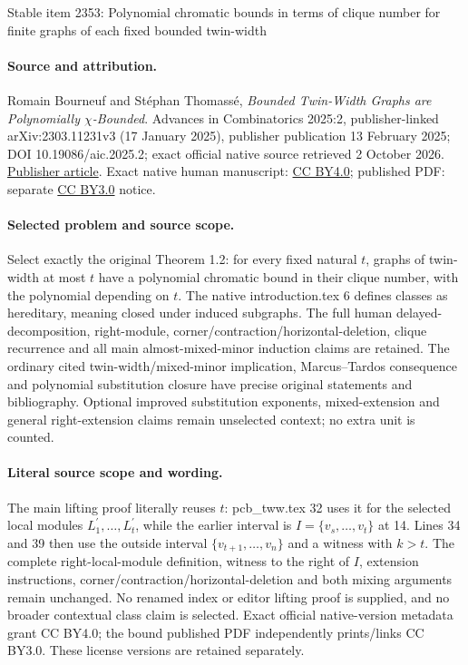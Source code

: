 \documentclass[11pt]{article}
\numberwithin{equation}{section}
\begin{document}
\begin{center}{\Large Stable item 2353: Polynomial chromatic bounds in terms of clique number for finite graphs of each fixed bounded twin-width}\end{center}
\paragraph{Source and attribution.} Romain Bourneuf and Stéphan Thomassé, \emph{Bounded Twin-Width Graphs are Polynomially \(\chi\)-Bounded}. Advances in Combinatorics 2025:2, publisher-linked arXiv:2303.11231v3 (17 January 2025), publisher publication 13 February 2025; DOI 10.19086/aic.2025.2; exact official native source retrieved 2 October 2026. \href{https://www.advancesincombinatorics.com/article/128477-bounded-twin-width-graphs-are-polynomially-bounded}{Publisher article}. Exact native human manuscript: \href{https://creativecommons.org/licenses/by/4.0/}{CC BY4.0}; published PDF: separate \href{https://creativecommons.org/licenses/by/3.0/}{CC BY3.0} notice.
\paragraph{Selected problem and source scope.} Select exactly the original Theorem 1.2: for every fixed natural \(t\), graphs of twin-width at most \(t\) have a polynomial chromatic bound in their clique number, with the polynomial depending on \(t\). The native introduction.tex 6 defines classes as hereditary, meaning closed under induced subgraphs. The full human delayed-decomposition, right-module, corner/contraction/horizontal-deletion, clique recurrence and all main almost-mixed-minor induction claims are retained. The ordinary cited twin-width/mixed-minor implication, Marcus--Tardos consequence and polynomial substitution closure have precise original statements and bibliography. Optional improved substitution exponents, mixed-extension and general right-extension claims remain unselected context; no extra unit is counted.
\paragraph{Literal source scope and wording.} The main lifting proof literally reuses \(t\): pcb\_tww.tex 32 uses it for the selected local modules \(L_1^\prime,\ldots,L_t^\prime\), while the earlier interval is \(I=\{v_s,\ldots,v_t\}\) at 14. Lines 34 and 39 then use the outside interval \(\{v_{t+1},\ldots,v_n\}\) and a witness with \(k>t\). The complete right-local-module definition, witness to the right of \(I\), extension instructions, corner/contraction/horizontal-deletion and both mixing arguments remain unchanged. No renamed index or editor lifting proof is supplied, and no broader contextual class claim is selected. Exact official native-version metadata grant CC BY4.0; the bound published PDF independently prints/links CC BY3.0. These license versions are retained separately.
\end{document}
